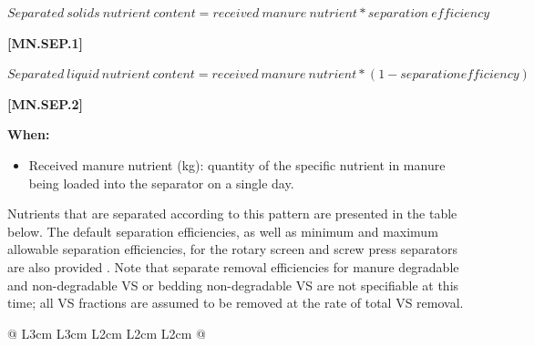 \begin{refsection}
    \begin{center}
\(Separated\ solids\ nutrient\ content = received\ manure\ nutrient * separation\ efficiency \)
    \end{center}
        \vspace{0.5cm} 
    
            {\raggedleft \textbf{[MN.SEP.1]}\par}
            \vspace{0.5cm}

    \begin{center}
\(Separated\ liquid\ nutrient\ content = received\ manure\ nutrient * (1 - separation efficiency)\)
    \end{center}
        \vspace{0.5cm} 
    
            {\raggedleft \textbf{[MN.SEP.2]}\par}
            \vspace{0.5cm}

\textbf{When:}
    \begin{itemize}
        \item Received manure nutrient (kg): quantity of the specific nutrient in manure being loaded into the separator on a single day. 
    \end{itemize}
    \vspace{0.2cm}
    
\vspace{0.2cm}

Nutrients that are separated according to this pattern are presented in the table below. The default separation efficiencies, as well as minimum and maximum allowable separation efficiencies, for the rotary screen and screw press separators are also provided \parencite{Hegg1981, Mukhtar1999, Varma2021}. Note that separate removal efficiencies for manure degradable and non-degradable VS or bedding non-degradable VS are not specifiable at this time; all VS fractions are assumed to be removed at the rate of total VS removal. 
\newpage

    \begin{table}[h!]
    \centering
    \renewcommand{\arraystretch}{1.3}
    \begin{center}
        \caption{The default, minimums, and maximums for various separation efficiencies.}
    \end{center}
    \vspace{-0.2cm}
    
    \begin{tabular}{@{}  L{3cm} L{3cm} L{2cm} L{2cm} L{2cm}   @{}}
    \toprule


\end{tabular}
\end{table}
\end{refsection}
